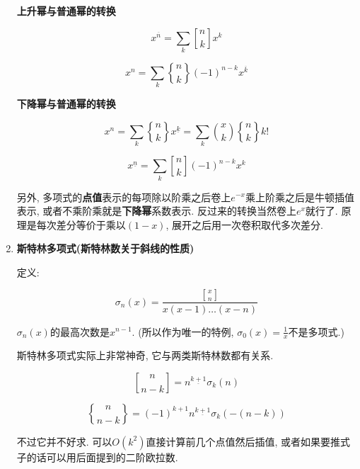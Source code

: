 \begin{enumerate}
\textbf{上升幂与普通幂的转换}

$$ x^{\overline{n}}=\sum_{k} {n \brack k} x^k $$

$$ x^n=\sum_{k} {n \brace k} (-1)^{n-k} x^{\overline{k}} $$

\textbf{下降幂与普通幂的转换}

$$ x^n=\sum_{k} {n \brace k} x^{\underline{k}} = \sum_{k} {x \choose k} {n \brace k} k! $$

$$ x^{\underline{n}}=\sum_{k} {n \brack k} (-1)^{n-k} x^k $$

另外, 多项式的\textbf{点值}表示的每项除以阶乘之后卷上$e^{-x}$乘上阶乘之后是牛顿插值表示, 或者不乘阶乘就是\textbf{下降幂}系数表示. 反过来的转换当然卷上$e^x$就行了. 原理是每次差分等价于乘以$(1 - x)$, 展开之后用一次卷积取代多次差分.

\item \textbf{斯特林多项式(斯特林数关于斜线的性质)}

定义:

$$ \sigma_n(x) = \frac {{x\brack n}} {x(x-1)\dots(x-n)} $$

$\sigma_n(x)$的最高次数是$x^{n - 1}$. (所以作为唯一的特例, $\sigma_0(x) = \frac 1 x$不是多项式.)

斯特林多项式实际上非常神奇, 它与两类斯特林数都有关系.

$$ {n \brack n-k} = n^{\underline{k+1}} \sigma_k(n) $$

$$ {n \brace n-k} = (-1)^{k+1} n^{\underline{k+1}} \sigma_k(-(n-k)) $$

不过它并不好求. 可以$O(k^2)$直接计算前几个点值然后插值, 或者如果要推式子的话可以用后面提到的二阶欧拉数.

\end{enumerate}